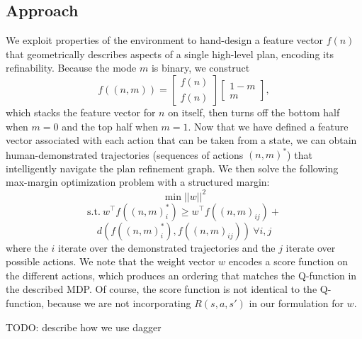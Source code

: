 \subsection{Approach}
We exploit properties of the environment to hand-design a feature vector $f(n)$ that geometrically
describes aspects of a single high-level plan, encoding its refinability. Because the mode $m$ is binary,
we construct $$f((n, m)) = \begin{bmatrix} f(n) \\ f(n) \end{bmatrix} \begin{bmatrix} 1 - m \\ m \end{bmatrix},$$
which stacks the feature vector for $n$ on itself, then turns off the bottom half when $m = 0$ and the
top half when $m = 1$. Now that we have defined a feature vector associated with each action that can be taken
from a state, we can obtain human-demonstrated trajectories (sequences of actions $(n, m)^{*}$) that intelligently
navigate the plan refinement graph. We then solve the following max-margin optimization problem with a structured margin:
$$\min ||w||^{2}$$
$$\text{s.t.}\ w^{\top}f((n, m)_{i}^{*}) \geq w^{\top}f((n, m)_{ij}) + $$
$$d(f((n, m)_{i}^{*}), f((n, m)_{ij}))\ \forall i, j$$
where the $i$ iterate over the demonstrated trajectories and the $j$ iterate over possible actions.
We note that the weight vector $w$ encodes a score function on the different actions, which produces
an ordering that matches the Q-function in the described MDP. Of course, the score function is not identical
to the Q-function, because we are not incorporating $R(s, a, s')$ in our formulation for $w$.

TODO: describe how we use dagger